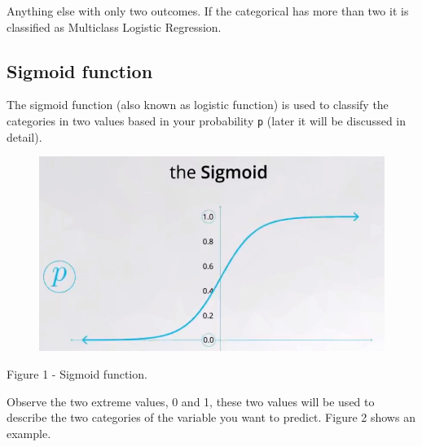 \documentclass[]{book}
\begin{document}
Anything else with only two outcomes. If the categorical has more than
two it is classified as Multiclass Logistic Regression.

\subsection{Sigmoid function}\label{sigmoid-function}

The sigmoid function (also known as logistic function) is used to
classify the categories in two values based in your probability
\texttt{p} (later it will be discussed in detail).

\begin{figure}
\centering
\includegraphics{01-img/c4_l16_01.png}
\caption{}
\end{figure}

Figure 1 - Sigmoid function.

Observe the two extreme values, 0 and 1, these two values will be used
to describe the two categories of the variable you want to predict.
Figure 2 shows an example.
\end{document}
